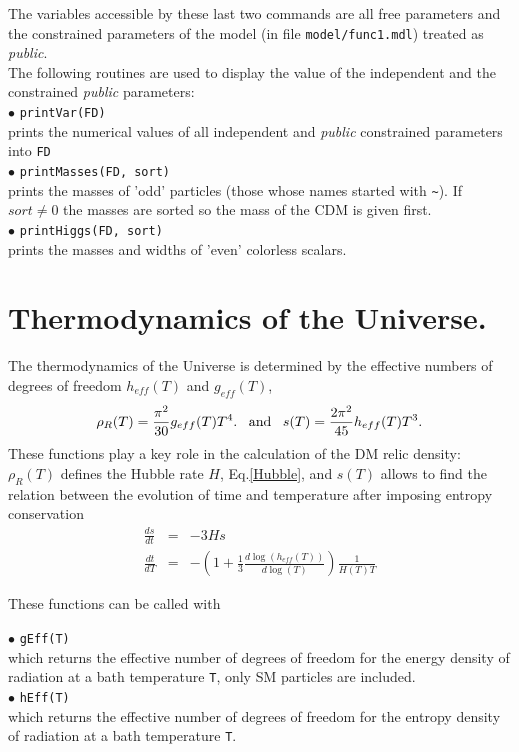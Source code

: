 \documentclass[12pt,a4paper]{article}
\begin{document}
\noindent
The variables accessible by these last two commands are all free parameters and   the 
constrained parameters of the model (in file \verb|model/func1.mdl|)
treated as {\it public}. \\


The following routines are used to display the value of the independent and the constrained 
{\it public} parameters:\\[2mm]
% 
$\bullet$ \verb|printVar(FD)|\\ 
prints the numerical values of all independent and {\it public} 
constrained parameters into \verb|FD|\\[2mm]
%
$\bullet$ \verb|printMasses(FD, sort)|\\
 prints the masses of 'odd' particles
(those whose names  started with \verb|~|). If $sort\ne 0$
the masses are sorted so the mass of the CDM is given first.\\[2mm]
%
$\bullet$ \verb|printHiggs(FD, sort)|\\
prints the masses and widths of 'even' colorless scalars.

\section { Thermodynamics of the Universe.}

The thermodynamics of  the Universe is determined by the effective numbers of degrees of
freedom  $h_{eff}(T)$ and $g_{eff}(T)$, 
\begin{equation}
  \rho_R(T) = \frac{\pi^2}{30} g_{eff}(T) T^4.   \;\;\;  {\rm and}   \;\;\;  s(T)=\frac{2\pi^2}{45} h_{eff}(T) T^3.
\end{equation}
  These functions play a key role in the calculation of the  DM relic density: $\rho_R(T)$ defines the Hubble rate $H$, Eq.\ref{Hubble}, and $s(T)$ allows to
find the relation between the evolution of time and temperature after imposing entropy conservation
\begin{eqnarray}
\label{entropyCons}
     \frac{ds}{dt}&=&-3Hs\\
     \frac{dt}{dT}&=&-\left(1+ \frac{1}{3} \frac{d\log(h_{eff}(T))}{d\log(T)}\right)\frac{1}{H(T) T} 
\end{eqnarray}




These functions  can be called with  

\noindent$\bullet$ \verb|gEff(T)|\\
 which returns the effective number of degrees of freedom for the energy density of radiation at a bath temperature \verb|T|,  only SM particles are
included.
 \\
\noindent$\bullet$ \verb|hEff(T)|\\ which returns the effective number of degrees of freedom for the entropy density of radiation at a bath temperature
\verb|T|.
\end{document}
